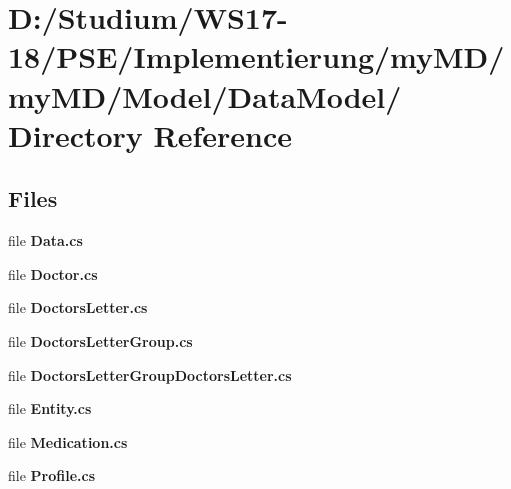 \hypertarget{dir_D_3A_2FStudium_2FWS17_2D18_2FPSE_2FImplementierung_2FmyMD_2FmyMD_2FModel_2FDataModel_2F}{
\section{D:/Studium/WS17-18/PSE/Implementierung/my\-MD/my\-MD/Model/Data\-Model/ Directory Reference}
\label{dir_D_3A_2FStudium_2FWS17_2D18_2FPSE_2FImplementierung_2FmyMD_2FmyMD_2FModel_2FDataModel_2F}
}


\subsection*{Files}
\begin{CompactItemize}
\item 
file {\bf Data.cs}
\item 
file {\bf Doctor.cs}
\item 
file {\bf Doctors\-Letter.cs}
\item 
file {\bf Doctors\-Letter\-Group.cs}
\item 
file {\bf Doctors\-Letter\-Group\-Doctors\-Letter.cs}
\item 
file {\bf Entity.cs}
\item 
file {\bf Medication.cs}
\item 
file {\bf Profile.cs}
\end{CompactItemize}
